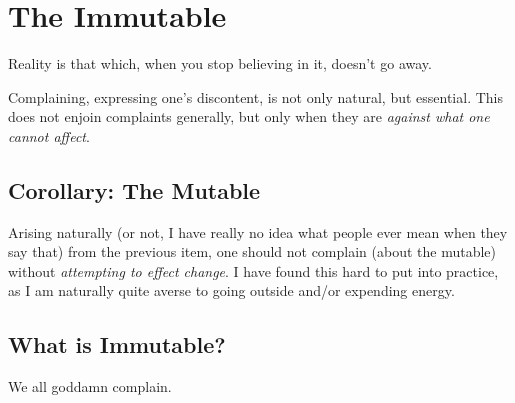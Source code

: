 \documentclass[../philo.tex]{subfiles}
\begin{document}
\chapter{The Immutable}
\epigraph{Reality is that which, when you stop believing in it, doesn't go away.}{}
\newpage

Complaining, expressing one's discontent, is not only natural, but essential.
This does not enjoin complaints generally, but only when they are \emph{against what one cannot affect}.

\section{Corollary: The Mutable}
Arising naturally (or not, I have really no idea what people ever mean when they say that) from the previous item, one should not complain (about the mutable) without \emph{attempting to effect change}.
I have found this hard to put into practice, as I am naturally quite averse to going outside and/or expending energy.

\section{What is Immutable?}
We all goddamn complain.
\end{document}
